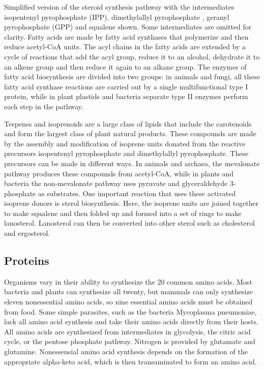 Simplified version of the steroid synthesis pathway with the intermediates isopentenyl pyrophosphate (IPP), dimethylallyl pyrophosphate , geranyl pyrophosphate (GPP) and squalene shown. Some intermediates are omitted for clarity.
Fatty acids are made by fatty acid synthases that polymerize and then reduce acetyl-CoA units. The acyl chains in the fatty acids are extended by a cycle of reactions that add the acyl group, reduce it to an alcohol, dehydrate it to an alkene group and then reduce it again to an alkane group. The enzymes of fatty acid biosynthesis are divided into two groups: in animals and fungi, all these fatty acid synthase reactions are carried out by a single multifunctional type I protein, while in plant plastids and bacteria separate type II enzymes perform each step in the pathway.

Terpenes and isoprenoids are a large class of lipids that include the carotenoids and form the largest class of plant natural products. These compounds are made by the assembly and modification of isoprene units donated from the reactive precursors isopentenyl pyrophosphate and dimethylallyl pyrophosphate. These precursors can be made in different ways. In animals and archaea, the mevalonate pathway produces these compounds from acetyl-CoA, while in plants and bacteria the non-mevalonate pathway uses pyruvate and glyceraldehyde 3-phosphate as substrates. One important reaction that uses these activated isoprene donors is sterol biosynthesis. Here, the isoprene units are joined together to make squalene and then folded up and formed into a set of rings to make lanosterol. Lanosterol can then be converted into other sterol such as cholesterol and ergosterol.

\hypertarget{proteins-1}{%
\subsection{Proteins}\label{proteins-1}}

Organisms vary in their ability to synthesize the 20 common amino acids. Most bacteria and plants can synthesize all twenty, but mammals can only synthesize eleven nonessential amino acids, so nine essential amino acids must be obtained from food. Some simple parasites, such as the bacteria Mycoplasma pneumoniae, lack all amino acid synthesis and take their amino acids directly from their hosts. All amino acids are synthesized from intermediates in glycolysis, the citric acid cycle, or the pentose phosphate pathway. Nitrogen is provided by glutamate and glutamine. Nonessensial amino acid synthesis depends on the formation of the appropriate alpha-keto acid, which is then transaminated to form an amino acid.

